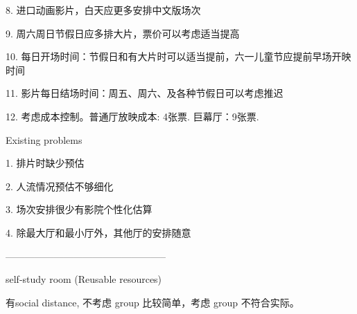 8. 进口动画影片，白天应更多安排中文版场次

9. 周六周日节假日应多排大片，票价可以考虑适当提高

10. 每日开场时间：节假日和有大片时可以适当提前，六一儿童节应提前早场开映时间

11. 影片每日结场时间：周五、周六、及各种节假日可以考虑推迟

12. 考虑成本控制。普通厅放映成本: 4张票. 巨幕厅：9张票.

Existing problems

1. 排片时缺少预估

2. 人流情况预估不够细化

3. 场次安排很少有影院个性化估算

4. 除最大厅和最小厅外，其他厅的安排随意

--------------------------------------------------

self-study room (Reusable resources)

有social distance, 不考虑 group 比较简单，考虑 group 不符合实际。 